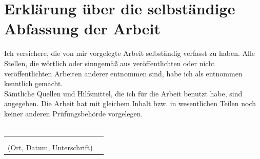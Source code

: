 \documentclass[a4paper,12pt,oneside]{article}
\begin{document}
\pagestyle{empty}
\section*{Erklärung über die selbständige\\Abfassung der Arbeit} %
Ich versichere, die von mir vorgelegte Arbeit selbständig verfasst zu haben.
Alle Stellen, die wörtlich oder sinngemäß aus veröffentlichten oder nicht veröffentlichten Arbeiten anderer entnommen sind,
habe ich als entnommen kenntlich gemacht.\\
Sämtliche Quellen und Hilfsmittel, die ich für die Arbeit benutzt habe, sind
angegeben. Die Arbeit hat mit gleichem Inhalt bzw. in wesentlichen Teilen noch keiner anderen Prüfungsbehörde vorgelegen.\\\\
\begin{tabular}{cp{7cm}}
                                    &             \\
                                    &             \\ \hline
  \small (Ort, Datum, Unterschrift) & \normalsize \\
\end{tabular}
   

\newpage
\thispagestyle{empty}

\end{document}
